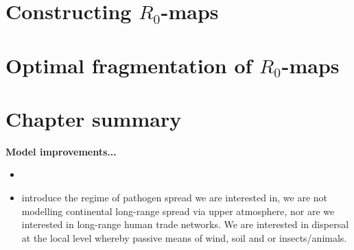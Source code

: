 

\section{Constructing $R_0$-maps}

\section{Optimal fragmentation of $R_0$-maps}


\section{Chapter summary}

\textbf{Model improvements...}
\begin{itemize}
    \item 
    \item introduce the regime of pathogen spread we are interested in, we are not modelling continental long-range spread via upper atmosphere, nor are we interested in long-range human trade networks. We are interested in dispersal at the local level whereby passive means of wind, soil and or insects/animals. 
\end{itemize}



